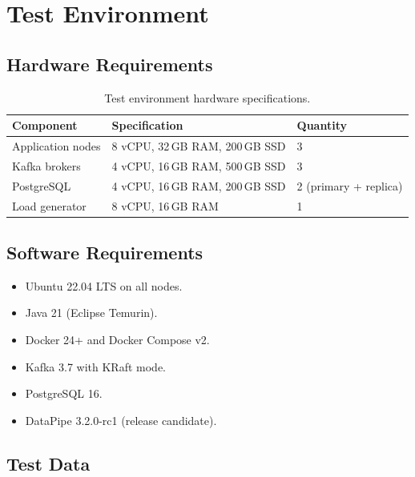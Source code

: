 \documentclass[
    language=english,
    doctype=technical-report,
    institution=none,
    titlestyle=book,
    oneside,
]{../../omnilatex}
\begin{document}
\chapter{Test Environment}
\label{sec:environment}

\section{Hardware Requirements}

\begin{table}[htbp]
    \centering
    \caption{Test environment hardware specifications.}
    \label{tab:hardware}
    \begin{tabular}{@{}lll@{}}
        \toprule
        Component & Specification & Quantity \\
        \midrule
        Application nodes & 8 vCPU, 32\,GB RAM, 200\,GB SSD & 3 \\
        Kafka brokers & 4 vCPU, 16\,GB RAM, 500\,GB SSD & 3 \\
        PostgreSQL & 4 vCPU, 16\,GB RAM, 200\,GB SSD & 2 (primary + replica) \\
        Load generator & 8 vCPU, 16\,GB RAM & 1 \\
        \bottomrule
    \end{tabular}
\end{table}

\section{Software Requirements}

\begin{itemize}
    \item Ubuntu 22.04 LTS on all nodes.
    \item Java 21 (Eclipse Temurin).
    \item Docker 24+ and Docker Compose v2.
    \item Kafka 3.7 with KRaft mode.
    \item PostgreSQL 16.
    \item DataPipe 3.2.0-rc1 (release candidate).
\end{itemize}

\section{Test Data}
\end{document}
